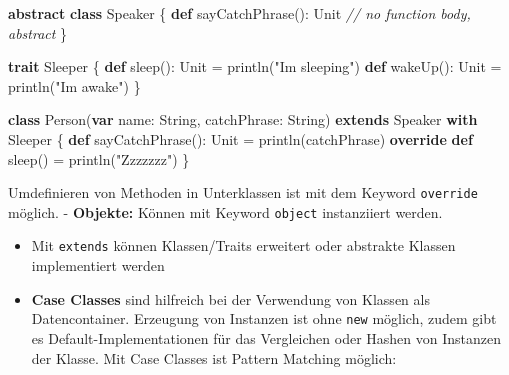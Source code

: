 \documentclass[]{article}
\newenvironment{Shaded}{}{}
\newcommand{\CommentTok}[1]{\textcolor[rgb]{0.38,0.63,0.69}{\textit{#1}}}
\newcommand{\FunctionTok}[1]{\textcolor[rgb]{0.02,0.16,0.49}{#1}}
\newcommand{\KeywordTok}[1]{\textcolor[rgb]{0.00,0.44,0.13}{\textbf{#1}}}
\newcommand{\NormalTok}[1]{#1}
\newcommand{\StringTok}[1]{\textcolor[rgb]{0.25,0.44,0.63}{#1}}
\begin{document}
\begin{Shaded}
\begin{Highlighting}[]
\KeywordTok{abstract} \KeywordTok{class}\NormalTok{ Speaker \{}
    \KeywordTok{def} \FunctionTok{sayCatchPhrase}\NormalTok{(): Unit }\CommentTok{// no function body, abstract}
\NormalTok{\}}

\KeywordTok{trait}\NormalTok{ Sleeper \{}
    \KeywordTok{def} \FunctionTok{sleep}\NormalTok{(): Unit = }\FunctionTok{println}\NormalTok{(}\StringTok{"I\textquotesingle{}m sleeping"}\NormalTok{)}
    \KeywordTok{def} \FunctionTok{wakeUp}\NormalTok{(): Unit = }\FunctionTok{println}\NormalTok{(}\StringTok{"I\textquotesingle{}m awake"}\NormalTok{)}
\NormalTok{\}}

\KeywordTok{class} \FunctionTok{Person}\NormalTok{(}\KeywordTok{var}\NormalTok{ name: String, catchPhrase: String) }\KeywordTok{extends}\NormalTok{ Speaker }\KeywordTok{with}\NormalTok{ Sleeper \{}
    \KeywordTok{def} \FunctionTok{sayCatchPhrase}\NormalTok{(): Unit = }\FunctionTok{println}\NormalTok{(catchPhrase)}
    \KeywordTok{override} \KeywordTok{def} \FunctionTok{sleep}\NormalTok{() = }\FunctionTok{println}\NormalTok{(}\StringTok{"Zzzzzzz"}\NormalTok{)}
\NormalTok{\}}
\end{Highlighting}
\end{Shaded}

Umdefinieren von Methoden in Unterklassen ist mit dem Keyword
\texttt{override} möglich. - \textbf{Objekte:} Können mit Keyword
\texttt{object} instanziiert werden.

\begin{itemize}
\item
  Mit \texttt{extends} können Klassen/Traits erweitert oder abstrakte
  Klassen implementiert werden
\item
  \textbf{Case Classes} sind hilfreich bei der Verwendung von Klassen
  als Datencontainer. Erzeugung von Instanzen ist ohne \texttt{new}
  möglich, zudem gibt es Default-Implementationen für das Vergleichen
  oder Hashen von Instanzen der Klasse. Mit Case Classes ist Pattern
  Matching möglich:
\end{itemize}

\begin{Shaded}
\end{Shaded}
\end{document}

